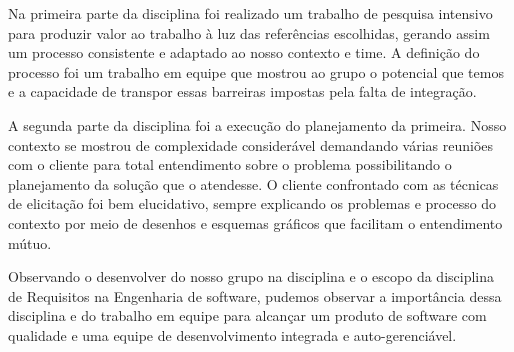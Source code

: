     Na primeira parte da disciplina foi realizado um trabalho de pesquisa intensivo para produzir valor ao 
  trabalho à luz das referências escolhidas, gerando assim um processo consistente e adaptado ao nosso contexto e time. 
  A definição do processo foi um trabalho em equipe que mostrou ao grupo o potencial que temos e a capacidade de 
  transpor essas barreiras impostas pela falta de integração.
    
    A segunda parte da disciplina foi a execução do planejamento da primeira. Nosso contexto se mostrou de 
  complexidade considerável demandando várias reuniões com o cliente para total entendimento sobre o problema 
  possibilitando o planejamento da solução que o atendesse. O cliente confrontado com as técnicas de elicitação 
  foi bem elucidativo, sempre explicando os problemas e processo do contexto por meio de desenhos e esquemas 
  gráficos que facilitam o entendimento mútuo.
    
    Observando o desenvolver do nosso grupo na disciplina e o escopo da disciplina de Requisitos na Engenharia de software, 
  pudemos observar a importância dessa disciplina e do trabalho em equipe para alcançar um produto de software com qualidade 
  e uma equipe de desenvolvimento integrada e auto-gerenciável.
